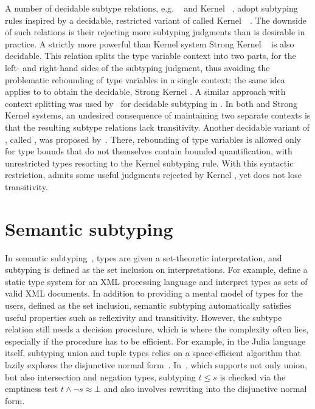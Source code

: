 A number of decidable subtype relations,
e.g. \WyvSelf~\cite{mackay:path-dep-dec:2020}
and Kernel \DSub~\cite{hu:dot-undec:2020},
adopt subtyping rules inspired by a decidable, restricted variant of \FSub
called Kernel~\FSub~\cite{cardelli:types-poly:1985}.
The downside of such relations is their rejecting more subtyping judgments
than is desirable in practice.
A strictly more powerful than Kernel \DSub system
Strong Kernel \DSub~\cite{hu:dot-undec:2020} is also decidable.
This relation splits the type variable context into two parts, for the left-
and right-hand sides of the subtyping judgment, thus avoiding the problematic
rebounding of type variables in a single context;
the same idea applies to \FSub to obtain the decidable, Strong Kernel \FSub.
A similar approach with context splitting was used
by~\citet{mackay:path-dep-dec:2020} for decidable subtyping in \WyvFix.
In both \WyvFix and Strong Kernel systems,
an undesired consequence of maintaining two separate contexts
is that the resulting subtype relations lack transitivity.
Another decidable variant of \FSub, called \FSubR, was proposed
by~\citet{mackay:bound-poly-sub-dec:2020}. There, %
rebounding of type variables is allowed
only for type bounds that do not themselves contain bounded quantification,
with unrestricted types resorting to the Kernel subtyping rule.
With this syntactic restriction, \FSubR admits some useful judgments
rejected by Kernel \FSub, yet does not lose transitivity.

\section{Semantic subtyping}

In semantic subtyping~\cite{frih:sem-sub:2008}, types are given a set-theoretic
interpretation, and subtyping is defined as the set inclusion on
interpretations.
For example, \citet{hosoya:reg-types-XML:2000} define a static type system for
an XML processing language and interpret types as sets of valid XML documents.
In addition to providing a mental model of types for the users,
defined as the set inclusion, semantic subtyping automatically satisfies
useful properties such as reflexivity and transitivity.
However, the subtype relation still needs a decision procedure,
which is where the complexity often lies, especially if the procedure
has to be efficient.
For example, in the Julia language itself, subtyping union and tuple types
relies on a space-efficient algorithm that lazily explores the disjunctive
normal form~\cite{chung:julia-sub-algo:2019}.
In~\cite{frisch:sem-sub:2002}, which supports not only union, but also
intersection and negation types, subtyping $t \leq s$ is checked via
the emptiness test $t \land \lnot s \approx \bot$ and also involves
rewriting into the disjunctive normal form.

